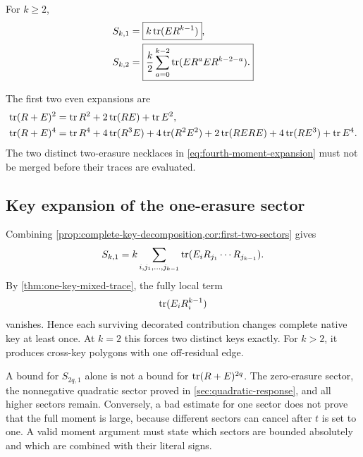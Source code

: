 \begin{corollary}
\label{cor:first-two-sectors}
For \(k\ge2\),
\begin{align}
 S_{k,1}
 &=\boxed{k\operatorname{tr}(ER^{k-1})},
 \label{eq:one-erasure-sector}\\
 S_{k,2}
 &=\boxed{
 \frac{k}{2}
 \sum_{a=0}^{k-2}
 \operatorname{tr}(E R^aE R^{k-2-a}).}
 \label{eq:two-erasure-sector}
\end{align}
\end{corollary}

The first two even expansions are
\begin{align}
 \operatorname{tr}(R+E)^2
 &=
 \operatorname{tr} R^2+2\operatorname{tr}(RE)+\operatorname{tr} E^2,
 \label{eq:second-moment-expansion}\\
 \operatorname{tr}(R+E)^4
 &=
 \operatorname{tr} R^4
 +4\operatorname{tr}(R^3E)
 +4\operatorname{tr}(R^2E^2)
 +2\operatorname{tr}(RERE)
 +4\operatorname{tr}(RE^3)
 +\operatorname{tr} E^4.
 \label{eq:fourth-moment-expansion}
\end{align}
The two distinct two-erasure necklaces in
\eqref{eq:fourth-moment-expansion} must not be merged before their traces
are evaluated.

\subsection{Key expansion of the one-erasure sector}

Combining \cref{prop:complete-key-decomposition,cor:first-two-sectors}
gives
\begin{equation}
 S_{k,1}
 =
 k
 \sum_{i,j_1,\ldots,j_{k-1}}
 \operatorname{tr}(E_iR_{j_1}\cdots R_{j_{k-1}}).
 \label{eq:key-expanded-linear-sector}
\end{equation}
By \cref{thm:one-key-mixed-trace}, the fully local term
\[
 \operatorname{tr}(E_iR_i^{k-1})
\]
vanishes.  Hence each surviving decorated contribution changes complete
native key at least once.  At \(k=2\) this forces two distinct keys exactly.
For \(k>2\), it produces cross-key polygons with one off-residual edge.

\begin{remark}
A bound for \(S_{2q,1}\) alone is not a bound for
\(\operatorname{tr}(R+E)^{2q}\).  The zero-erasure sector, the nonnegative quadratic
sector proved in \cref{sec:quadratic-response}, and all higher sectors
remain.  Conversely, a bad estimate for one sector does not prove that the
full moment is large, because different sectors can cancel after \(t\) is
set to one.  A valid moment argument must state which sectors are bounded
absolutely and which are combined with their literal signs.
\end{remark}

